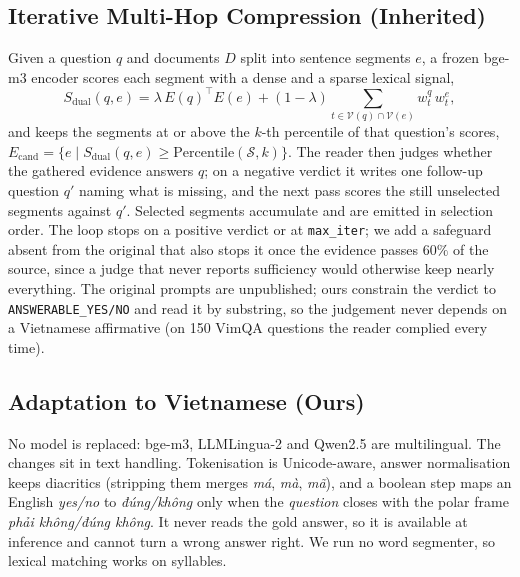 \documentclass[runningheads]{llncs}
\begin{document}
\subsection{Iterative Multi-Hop Compression (Inherited)}
Given a question $q$ and documents $D$ split into sentence segments $e$, a frozen
bge-m3 encoder \cite{chen2024bgem3} scores each segment with a dense and a sparse
lexical signal,
\begin{equation}
S_{\text{dual}}(q,e) = \lambda\, E(q)^\top E(e) + (1-\lambda)
\sum_{t \in \mathcal{V}(q)\cap\mathcal{V}(e)} w_t^{q}\, w_t^{e},
\end{equation}
and keeps the segments at or above the $k$-th percentile of that question's
scores, $E_{\text{cand}}=\{e \mid S_{\text{dual}}(q,e)\ge
\mathrm{Percentile}(\mathcal{S},k)\}$. The reader then judges whether the
gathered evidence answers $q$; on a negative verdict it writes one follow-up
question $q'$ naming what is missing, and the next pass scores the still
unselected segments against $q'$. Selected segments accumulate and are emitted in
selection order. The loop stops on a positive verdict or at \texttt{max\_iter}; we add a
safeguard absent from the original that also stops it once the evidence passes
$60\%$ of the source, since a judge that never reports sufficiency would
otherwise keep nearly everything. The original prompts are
unpublished; ours constrain the verdict to \texttt{ANSWERABLE\_YES/NO} and read
it by substring, so the judgement never depends on a Vietnamese affirmative (on
150 VimQA questions the reader complied every time).

\subsection{Adaptation to Vietnamese (Ours)}
No model is replaced: bge-m3, LLMLingua-2 and Qwen2.5 are multilingual. The
changes sit in text handling. Tokenisation is Unicode-aware, answer normalisation
keeps diacritics (stripping them merges \emph{má}, \emph{mà}, \emph{mã}), and a
boolean step maps an English \emph{yes/no} to \emph{đúng/không} only when the
\emph{question} closes with the polar frame \emph{phải không/đúng không}. It never
reads the gold answer, so it is available at inference and cannot turn a wrong
answer right. We run no word segmenter, so lexical matching works on syllables.
\end{document}
